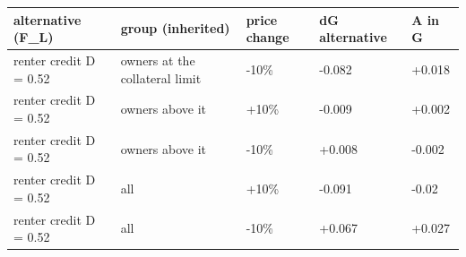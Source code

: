 \begingroup\small
\setlength{\tabcolsep}{3pt}
\renewcommand{\arraystretch}{1.04}
\begin{tabularx}{\linewidth}{XXXXX}
\toprule
alternative (F\_L) & group (inherited) & price change & dG alternative & A in G \\
\midrule
renter credit D = 0.52 & owners at the collateral limit & -10\% & -0.082 & +0.018 \\
renter credit D = 0.52 & owners above it & +10\% & -0.009 & +0.002 \\
renter credit D = 0.52 & owners above it & -10\% & +0.008 & -0.002 \\
renter credit D = 0.52 & all & +10\% & -0.091 & -0.02 \\
renter credit D = 0.52 & all & -10\% & +0.067 & +0.027 \\
\bottomrule
\end{tabularx}
\endgroup
